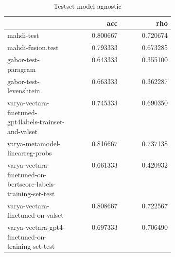 \begin{table}
\caption{Testset model-agnostic}
\label{test-agnostic}
\begin{tabular}{|p{0.4\linewidth}|r|r|}
\hline
 & acc & rho \\
\hline
mahdi-test & 0.800667 & 0.720674 \\
\cline{1-3}
mahdi-fusion.test & 0.793333 & 0.673285 \\
\cline{1-3}
gabor-test-paragram & 0.643333 & 0.355100 \\
\cline{1-3}
gabor-test-levenshtein & 0.663333 & 0.362287 \\
\cline{1-3}
varya-vectara-finetuned-gpt4labels-trainset-and-valset & 0.745333 & 0.690350 \\
\cline{1-3}
varya-metamodel-linearreg-probs & 0.816667 & 0.737138 \\
\cline{1-3}
varya-vectara-finetuned-on-bertscore-labels-training-set-test & 0.661333 & 0.420932 \\
\cline{1-3}
varya-vectara-finetuned-on-valset & 0.808667 & 0.722567 \\
\cline{1-3}
varya-vectara-gpt4-finetuned-on-training-set-test & 0.697333 & 0.706490 \\
\cline{1-3}
\hline
\end{tabular}
\end{table}
